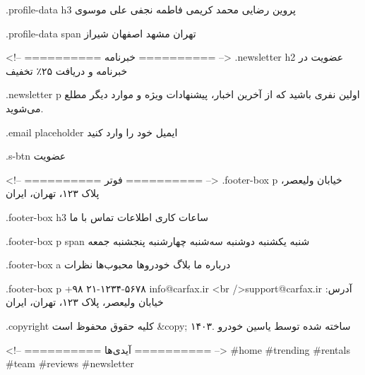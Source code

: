 .profile-data h3
پروین رضایی
محمد کریمی
فاطمه نجفی
علی موسوی

.profile-data span
تهران
مشهد
اصفهان
شیراز

<!-- ========== خبرنامه ========== -->
.newsletter h2
عضویت در خبرنامه و دریافت ۲۵٪ تخفیف

.newsletter p
اولین نفری باشید که از آخرین اخبار، پیشنهادات ویژه و موارد دیگر مطلع می‌شوید.

.email placeholder
ایمیل خود را وارد کنید

.s-btn
عضویت

<!-- ========== فوتر ========== -->
.footer-box p
خیابان ولیعصر، پلاک ۱۲۳، تهران، ایران

.footer-box h3
ساعات کاری
اطلاعات
تماس با ما

.footer-box p span
شنبه
یکشنبه
دوشنبه
سه‌شنبه
چهارشنبه
پنجشنبه
جمعه

.footer-box a
درباره ما
بلاگ
خودروها
محبوب‌ها
نظرات

.footer-box p
+۹۸ ۲۱-۱۲۳۴-۵۶۷۸
info@carfax.ir <br />support@carfax.ir
آدرس: خیابان ولیعصر، پلاک ۱۲۳، تهران، ایران

.copyright
کلیه حقوق محفوظ است &copy; ۱۴۰۳. ساخته شده توسط یاسین خودرو

<!-- ========== آیدی‌ها ========== -->
#home
#trending
#rentals
#team
#reviews
#newsletter